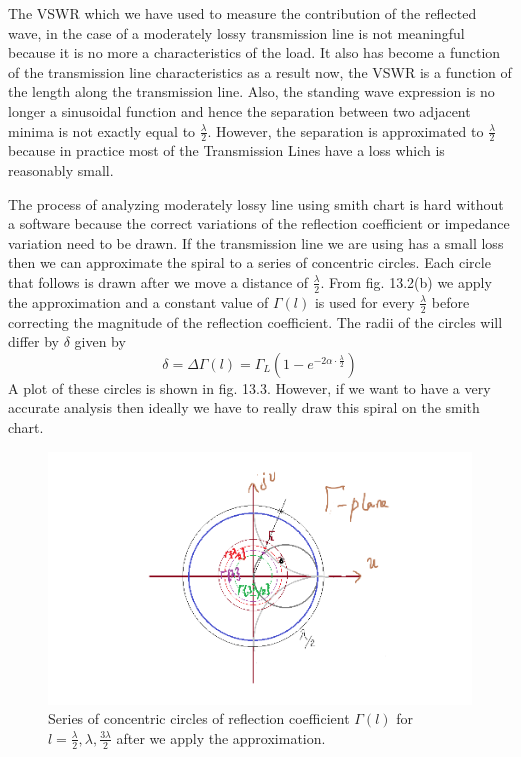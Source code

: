 The VSWR which we have used to measure the contribution of the reflected wave, in the case of a moderately lossy transmission line is not meaningful because it is no more a characteristics of the load. It also has become a function of the transmission line characteristics as a result now, the VSWR is a function of the length along the transmission line. Also, the standing wave expression is no longer a sinusoidal function and hence the separation between two adjacent minima is not exactly equal to $\frac{\lambda}{2}$. However, the separation is approximated to $\frac{\lambda}{2}$ because in practice most of the Transmission Lines have a loss which is reasonably small.

The process of analyzing moderately lossy line using smith chart is hard without a software because the correct variations of the reflection coefficient or impedance variation need to be drawn. If the transmission line we are using has a small loss then we can approximate the spiral to a series of concentric circles. Each circle that follows is drawn after we move a distance of $\frac{\lambda}{2}$. From fig. 13.2(b) we apply the approximation and a constant value of $\Gamma{(l)}$ is used for every $\frac{\lambda}{2}$ before correcting the magnitude of the reflection coefficient. The radii of the circles will differ by $\delta$ given by
\begin{dmath*}
\delta = \Delta \Gamma{(l)} = \Gamma_L(1 - e^{-2\alpha\cdot \frac{\lambda}{2}})
\end{dmath*}
A plot of these circles is shown in fig. 13.3. However, if we want to have a very accurate analysis then ideally we have to really draw this spiral on the smith chart.
\begin{figure}[ht]
\centering
\includegraphics[width=1\linewidth]{"./graphics/Diagram"}
\caption{Series of concentric circles of reflection coefficient $\Gamma{(l)}$ for $l = \frac{\lambda}{2},\lambda, \frac{3\lambda}{2}$ after we apply the approximation.}
\end{figure}

